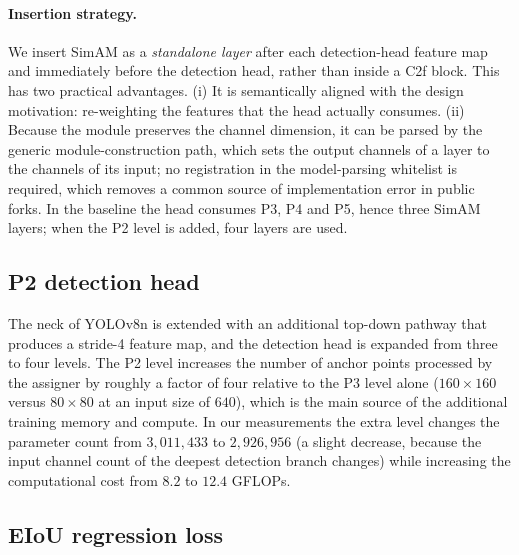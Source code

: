 \documentclass[pdflatex,sn-basic,Numbered]{sn-jnl}%
\begin{document}
\paragraph{Insertion strategy.}
We insert SimAM as a \emph{standalone layer} after each detection-head feature map and immediately before the detection head, rather than inside a C2f block. This has two practical advantages. (i) It is semantically aligned with the design motivation: re-weighting the features that the head actually consumes. (ii) Because the module preserves the channel dimension, it can be parsed by the generic module-construction path, which sets the output channels of a layer to the channels of its input; no registration in the model-parsing whitelist is required, which removes a common source of implementation error in public forks. In the baseline the head consumes P3, P4 and P5, hence three SimAM layers; when the P2 level is added, four layers are used.

\subsection{P2 detection head}\label{sec:p2}

The neck of YOLOv8n is extended with an additional top-down pathway that produces a stride-4 feature map, and the detection head is expanded from three to four levels. The P2 level increases the number of anchor points processed by the assigner by roughly a factor of four relative to the P3 level alone ($160\times160$ versus $80\times80$ at an input size of $640$), which is the main source of the additional training memory and compute. In our measurements the extra level changes the parameter count from $3{,}011{,}433$ to $2{,}926{,}956$ (a slight decrease, because the input channel count of the deepest detection branch changes) while increasing the computational cost from $8.2$ to $12.4$ GFLOPs.

\subsection{EIoU regression loss}\label{sec:eiou}
\end{document}
